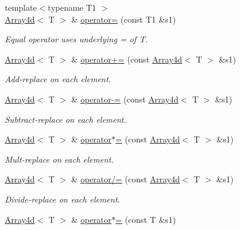 \begin{DoxyCompactItemize}
{\footnotesize template$<$typename T1 $>$ }\\\mbox{\hyperlink{classXMLArray_1_1Array4d}{Array4d}}$<$ T $>$ \& \mbox{\hyperlink{classXMLArray_1_1Array4d_a15b8c36a1edd1f72a12301798e0810b5}{operator=}} (const T1 \&s1)
\begin{DoxyCompactList}\small\item\em Equal operator uses underlying = of T. \end{DoxyCompactList}\item 
\mbox{\hyperlink{classXMLArray_1_1Array4d}{Array4d}}$<$ T $>$ \& \mbox{\hyperlink{classXMLArray_1_1Array4d_a3ee4e8302e86bcfec817cae81a5fe1bf}{operator+=}} (const \mbox{\hyperlink{classXMLArray_1_1Array4d}{Array4d}}$<$ T $>$ \&s1)
\begin{DoxyCompactList}\small\item\em Add-\/replace on each element. \end{DoxyCompactList}\item 
\mbox{\hyperlink{classXMLArray_1_1Array4d}{Array4d}}$<$ T $>$ \& \mbox{\hyperlink{classXMLArray_1_1Array4d_ad192d15277494d22a81c86852eaa5466}{operator-\/=}} (const \mbox{\hyperlink{classXMLArray_1_1Array4d}{Array4d}}$<$ T $>$ \&s1)
\begin{DoxyCompactList}\small\item\em Subtract-\/replace on each element. \end{DoxyCompactList}\item 
\mbox{\hyperlink{classXMLArray_1_1Array4d}{Array4d}}$<$ T $>$ \& \mbox{\hyperlink{classXMLArray_1_1Array4d_accb002ecd8742a2aba3e4acaf92963c6}{operator$\ast$=}} (const \mbox{\hyperlink{classXMLArray_1_1Array4d}{Array4d}}$<$ T $>$ \&s1)
\begin{DoxyCompactList}\small\item\em Mult-\/replace on each element. \end{DoxyCompactList}\item 
\mbox{\hyperlink{classXMLArray_1_1Array4d}{Array4d}}$<$ T $>$ \& \mbox{\hyperlink{classXMLArray_1_1Array4d_ac8d0ba2bc4f085bf48baf6530db0cfcb}{operator/=}} (const \mbox{\hyperlink{classXMLArray_1_1Array4d}{Array4d}}$<$ T $>$ \&s1)
\begin{DoxyCompactList}\small\item\em Divide-\/replace on each element. \end{DoxyCompactList}\item 
\mbox{\hyperlink{classXMLArray_1_1Array4d}{Array4d}}$<$ T $>$ \& \mbox{\hyperlink{classXMLArray_1_1Array4d_ac8c9fbcc39636658f94e7adc00c172b3}{operator$\ast$=}} (const T \&s1)

\end{DoxyCompactItemize}
